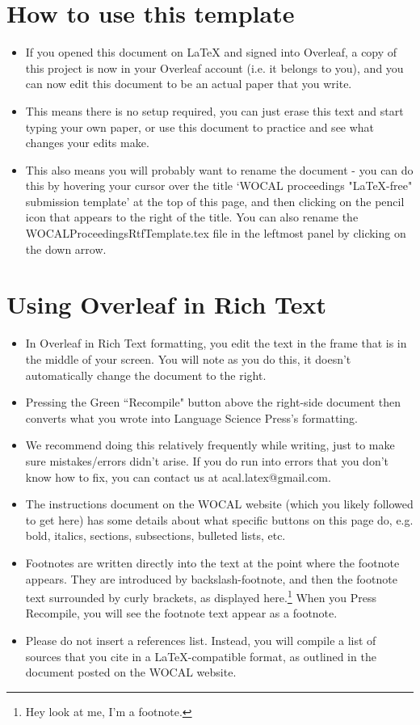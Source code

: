 \documentclass[output=paper,colorlinks,citecolor=brown,
]{langscibook}
\begin{document}
\section{How to use this template}
\begin{itemize}

\item If you opened this document on LaTeX and signed into Overleaf, a copy of this project is now in your Overleaf account (i.e. it belongs to you), and you can now edit this document to be an actual paper that you write. 
\item This means there is no setup required, you can just erase this text and start typing your own paper, or use this document to practice and see what changes your edits make.
\item This also means you will probably want to rename the document - you can do this by hovering your cursor over the title `WOCAL proceedings "LaTeX-free" submission template' at the top of this page, and then clicking on the pencil icon that appears to the right of the title. You can also rename the WOCALProceedingsRtfTemplate.tex file in the leftmost panel by clicking on the down arrow.
\end{itemize}

\section{Using Overleaf in Rich Text}
\begin{itemize}

\item In Overleaf in Rich Text formatting, you edit the text in the frame that is in the middle of your screen. You will note as you do this, it doesn't automatically change the  document to the right.
\item Pressing the Green ``Recompile" button above the right-side document then converts what you wrote into Language Science Press's formatting. 
\item We recommend doing this relatively frequently while writing, just to make sure mistakes/errors didn't arise. If you do run into errors that you don't know how to fix, you can contact us at acal.latex@gmail.com. 
\item The instructions document on the WOCAL website (which you likely followed to get here) has some details about what specific buttons on this page do, e.g. bold, italics, sections, subsections, bulleted lists, etc.
\item Footnotes are written directly into the text at the point where the footnote appears. They are introduced by backslash-footnote, and then the footnote text surrounded by curly brackets, as displayed here.\footnote{Hey look at me, I'm a footnote.} When you Press Recompile, you will see the footnote text appear as a footnote.
\item Please do not insert a references list. Instead, you will compile a list of sources that you cite in a LaTeX-compatible format, as outlined in the document posted on the WOCAL website.
\end{itemize}
\end{document}
